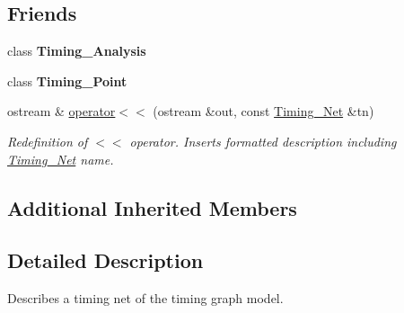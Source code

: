 \subsection*{Friends}
\begin{DoxyCompactItemize}
\item 
\hypertarget{classTiming__Analysis_1_1Timing__Net_aab560f9cdcd55852a6a08a29a54a2b16}{class {\bfseries Timing\-\_\-\-Analysis}}\label{classTiming__Analysis_1_1Timing__Net_aab560f9cdcd55852a6a08a29a54a2b16}

\item 
\hypertarget{classTiming__Analysis_1_1Timing__Net_a2562d249ea959d9e392abdffe35cdbad}{class {\bfseries Timing\-\_\-\-Point}}\label{classTiming__Analysis_1_1Timing__Net_a2562d249ea959d9e392abdffe35cdbad}

\item 
ostream \& \hyperlink{classTiming__Analysis_1_1Timing__Net_affa1b519dc847065ac579b4c8726c740}{operator$<$$<$} (ostream \&out, const \hyperlink{classTiming__Analysis_1_1Timing__Net}{Timing\-\_\-\-Net} \&tn)
\begin{DoxyCompactList}\small\item\em Redefinition of $<$$<$ operator. Inserts formatted description including \hyperlink{classTiming__Analysis_1_1Timing__Net}{Timing\-\_\-\-Net} name. \end{DoxyCompactList}\end{DoxyCompactItemize}
\subsection*{Additional Inherited Members}


\subsection{Detailed Description}
Describes a timing net of the timing graph model. 



